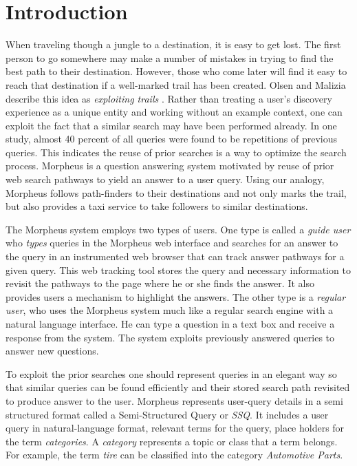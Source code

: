 \section{Introduction}



When traveling though a jungle to a destination, it is easy to get
lost.  The first person to go somewhere may make a number of mistakes
in trying to find the best path to their destination.  However, those
who come later will find it easy to reach that destination if a
well-marked trail has been created. Olsen and Malizia describe this
idea as \emph{exploiting trails} \cite{5379671}.  Rather than treating
a user's discovery experience as a unique entity and working without an example
context, one can exploit the fact that a similar search may have been
performed already.  In one study, almost 40 percent of all queries
were found to be repetitions of previous queries\cite{1277770}. This
indicates the reuse of prior searches is a way to optimize the search
process.  Morpheus is a question answering system motivated by reuse of prior
web search pathways to yield an answer to a user query. Using our analogy,
Morpheus follows path-finders to their destinations and not only marks the
trail, but also provides a taxi service to take followers to similar
destinations.

The Morpheus system employs two types of users. One type is called a
\textit{guide user} who \textit{types} queries in the Morpheus web interface and
searches for an answer to the query in an instrumented web browser that can
track answer pathways for a given query. This web tracking tool stores the query
and necessary information to revisit the pathways to the page where he or she
finds the answer. It also provides users a mechanism to highlight the answers.
The other type is a \textit{regular user}, who uses the Morpheus system much
like a regular search engine with a natural language interface. He can type a
question in a text box and receive a response from the system. The system
exploits previously answered queries to answer new questions.

To exploit the prior searches one should represent queries in an elegant way so
that similar queries can be found efficiently and their stored search path
revisited to produce answer to the user. Morpheus represents user-query details
in a semi structured format called a Semi-Structured Query or \textit{SSQ}. It
includes a user query in natural-language format, relevant terms for the query,
place holders for the term \textit{categories}. A \textit{category} represents a
topic or class that a term belongs. For example, the term \textit{tire} can be
classified into the category \textit{Automotive Parts}.

